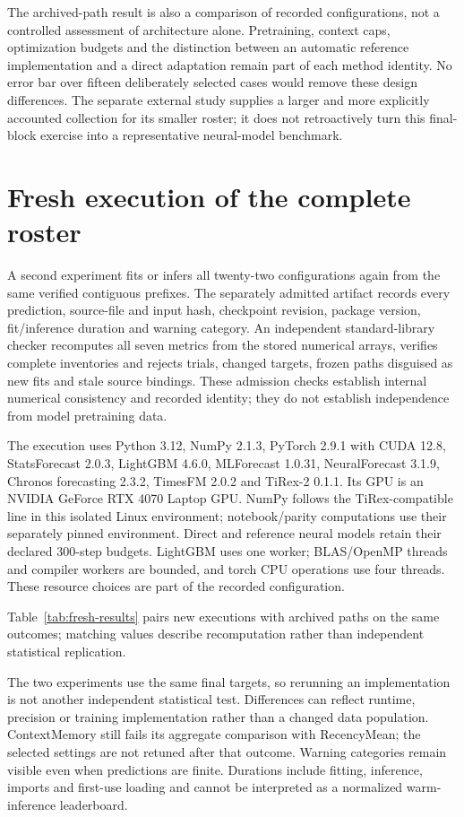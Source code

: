 \documentclass[11pt,a4paper]{article}
\begin{document}
The archived-path result is also a comparison of recorded configurations, not a controlled assessment of architecture alone. Pretraining, context caps, optimization budgets and the distinction between an automatic reference implementation and a direct adaptation remain part of each method identity. No error bar over fifteen deliberately selected cases would remove these design differences. The separate external study supplies a larger and more explicitly accounted collection for its smaller roster; it does not retroactively turn this final-block exercise into a representative neural-model benchmark.

\section{Fresh execution of the complete roster}
A second experiment fits or infers all twenty-two configurations again from the same verified contiguous prefixes. The separately admitted artifact records every prediction, source-file and input hash, checkpoint revision, package version, fit/inference duration and warning category. An independent standard-library checker recomputes all seven metrics from the stored numerical arrays, verifies complete inventories and rejects trials, changed targets, frozen paths disguised as new fits and stale source bindings. These admission checks establish internal numerical consistency and recorded identity; they do not establish independence from model pretraining data.

The execution uses Python 3.12, NumPy 2.1.3, PyTorch 2.9.1 with CUDA 12.8, StatsForecast 2.0.3, LightGBM 4.6.0, MLForecast 1.0.31, NeuralForecast 3.1.9, Chronos forecasting 2.3.2, TimesFM 2.0.2 and TiRex-2 0.1.1. Its GPU is an NVIDIA GeForce RTX 4070 Laptop GPU. NumPy follows the TiRex-compatible line in this isolated Linux environment; notebook/parity computations use their separately pinned environment. Direct and reference neural models retain their declared 300-step budgets. LightGBM uses one worker; BLAS/OpenMP threads and compiler workers are bounded, and torch CPU operations use four threads. These resource choices are part of the recorded configuration.

Table~\ref{tab:fresh-results} pairs new executions with archived paths on the same outcomes; matching values describe recomputation rather than independent statistical replication.


The two experiments use the same final targets, so rerunning an implementation is not another independent statistical test. Differences can reflect runtime, precision or training implementation rather than a changed data population. ContextMemory still fails its aggregate comparison with RecencyMean; the selected settings are not retuned after that outcome. Warning categories remain visible even when predictions are finite. Durations include fitting, inference, imports and first-use loading and cannot be interpreted as a normalized warm-inference leaderboard.
\end{document}
